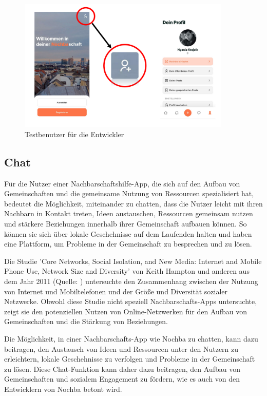 \begin{figure}[H]
  \centering
  \includegraphics[width=0.9\textwidth]{pics/dummy-user-screenshots.png}
  \caption{Testbenutzer für die Entwickler}
  \label{fig:dummy-user-screenshots}
\end{figure}


\subsection{Chat}

Für die Nutzer einer Nachbarschaftshilfe-App, die sich auf den Aufbau von Gemeinschaften und die gemeinsame Nutzung von Ressourcen spezialisiert hat, bedeutet die Möglichkeit, miteinander zu chatten, dass die Nutzer leicht mit ihren Nachbarn in Kontakt treten, Ideen austauschen, Ressourcen gemeinsam nutzen und stärkere Beziehungen innerhalb ihrer Gemeinschaft aufbauen können. So können sie sich über lokale Geschehnisse auf dem Laufenden halten und haben eine Plattform, um Probleme in der Gemeinschaft zu besprechen und zu lösen.

Die Studie 'Core Networks, Social Isolation, and New Media: Internet and Mobile Phone Use, Network Size and Diversity' von Keith Hampton und anderen aus dem Jahr 2011 (Quelle: \cite{hampton2011core} ) untersuchte den Zusammenhang zwischen der Nutzung von Internet und Mobiltelefonen und der Größe und Diversität sozialer Netzwerke. Obwohl diese Studie nicht speziell Nachbarschafts-Apps untersuchte, zeigt sie den potenziellen Nutzen von Online-Netzwerken für den Aufbau von Gemeinschaften und die Stärkung von Beziehungen.

Die Möglichkeit, in einer Nachbarschafts-App wie Nochba zu chatten, kann dazu beitragen, den Austausch von Ideen und Ressourcen unter den Nutzern zu erleichtern, lokale Geschehnisse zu verfolgen und Probleme in der Gemeinschaft zu lösen. Diese Chat-Funktion kann daher dazu beitragen, den Aufbau von Gemeinschaften und sozialem Engagement zu fördern, wie es auch von den Entwicklern von Nochba betont wird.

